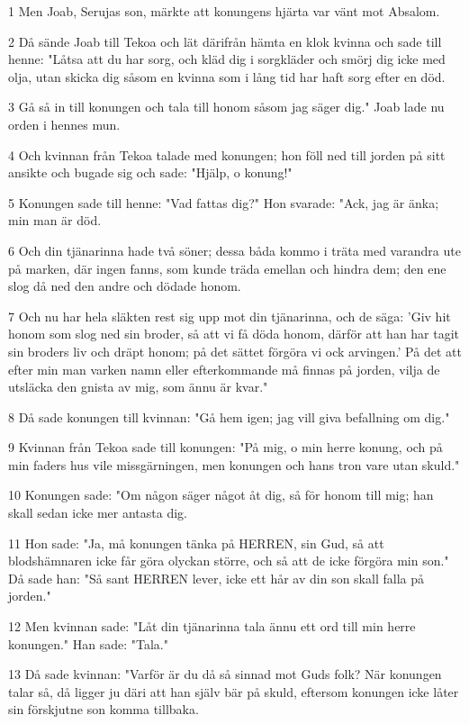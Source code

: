 \par 1 Men Joab, Serujas son, märkte att konungens hjärta var vänt mot Absalom.
\par 2 Då sände Joab till Tekoa och lät därifrån hämta en klok kvinna och sade till henne: "Låtsa att du har sorg, och kläd dig i sorgkläder och smörj dig icke med olja, utan skicka dig såsom en kvinna som i lång tid har haft sorg efter en död.
\par 3 Gå så in till konungen och tala till honom såsom jag säger dig." Joab lade nu orden i hennes mun.
\par 4 Och kvinnan från Tekoa talade med konungen; hon föll ned till jorden på sitt ansikte och bugade sig och sade: "Hjälp, o konung!"
\par 5 Konungen sade till henne: "Vad fattas dig?" Hon svarade: "Ack, jag är änka; min man är död.
\par 6 Och din tjänarinna hade två söner; dessa båda kommo i träta med varandra ute på marken, där ingen fanns, som kunde träda emellan och hindra dem; den ene slog då ned den andre och dödade honom.
\par 7 Och nu har hela släkten rest sig upp mot din tjänarinna, och de säga: 'Giv hit honom som slog ned sin broder, så att vi få döda honom, därför att han har tagit sin broders liv och dräpt honom; på det sättet förgöra vi ock arvingen.' På det att efter min man varken namn eller efterkommande må finnas på jorden, vilja de utsläcka den gnista av mig, som ännu är kvar."
\par 8 Då sade konungen till kvinnan: "Gå hem igen; jag vill giva befallning om dig."
\par 9 Kvinnan från Tekoa sade till konungen: "På mig, o min herre konung, och på min faders hus vile missgärningen, men konungen och hans tron vare utan skuld."
\par 10 Konungen sade: "Om någon säger något åt dig, så för honom till mig; han skall sedan icke mer antasta dig.
\par 11 Hon sade: "Ja, må konungen tänka på HERREN, sin Gud, så att blodshämnaren icke får göra olyckan större, och så att de icke förgöra min son." Då sade han: "Så sant HERREN lever, icke ett hår av din son skall falla på jorden."
\par 12 Men kvinnan sade: "Låt din tjänarinna tala ännu ett ord till min herre konungen." Han sade: "Tala."
\par 13 Då sade kvinnan: "Varför är du då så sinnad mot Guds folk? När konungen talar så, då ligger ju däri att han själv bär på skuld, eftersom konungen icke låter sin förskjutne son komma tillbaka.
